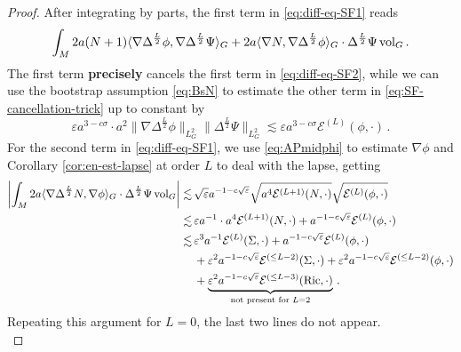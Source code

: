 \documentclass[11pt,leqno,textwidth=10cm]{amsart}
\numberwithin{equation}{section}
\theoremstyle{definition}
\theoremstyle{plain}
\newcommand{\1}{\mathbbm{1}}
\newcommand{\E}{\mathcal{E}}
\newcommand{\Ric}{\text{\normalfont{Ric}}}
\newcommand{\vol}[1]{{\text{\normalfont{vol}}}_{#1}}
\renewcommand{\epsilon}{\varepsilon}
\newcommand{\Lap}{\Delta}
\begin{document}
\begin{proof}
After integrating by parts, the first term in \eqref{eq:diff-eq-SF1} reads
\begin{equation}\label{eq:SF-cancellation-trick}
\int_M 2a(N+1)\langle\nabla\Lap^{\frac{L}2}\phi,\nabla\Lap^{\frac{L}2}\Psi\rangle_G+2a\langle\nabla N,\nabla\Lap^{\frac{L}2}\phi\rangle_G\cdot\Lap^{\frac{L}2}\Psi\,\vol{G}\,.
\end{equation}
The first term \textbf{precisely} cancels the first term in \eqref{eq:diff-eq-SF2}, while we can use the bootstrap assumption \eqref{eq:BsN} to estimate the other term in \eqref{eq:SF-cancellation-trick} up to constant by
\begin{equation*}
\epsilon a^{3-c\sigma}\cdot a^2\|\nabla\Lap^{\frac{L}2}\phi\|_{L^2_G}\|\Lap^{\frac{L}2}\Psi\|_{L^2_G}\lesssim\epsilon a^{3-c\sigma}\E^{(L)}(\phi,\cdot)\,.
\end{equation*}
For the second term in \eqref{eq:diff-eq-SF1}, we use \eqref{eq:APmidphi} to estimate $\nabla\phi$ and Corollary \ref{cor:en-est-lapse} at order $L$ to deal with the lapse, getting
\begin{align*}
\left\lvert\int_M 2a\langle\nabla\Lap^{\frac{L}2}N,\nabla\phi\rangle_G\cdot \Lap^{\frac{L}2}\Psi\,\vol{G}\right\rvert\lesssim&\,\sqrt{\epsilon}a^{-1-c\sqrt{\epsilon}}\sqrt{a^4\E^{(L+1)}(N,\cdot)}\sqrt{\E^{(L)}(\phi,\cdot)}\\
\lesssim&\,\epsilon a^{-1}\cdot a^4\E^{(L+1)}(N,\cdot)+a^{-1-c\sqrt{\epsilon}}\E^{(L)}(\phi,\cdot)\\
\lesssim&\,\epsilon^3a^{-1}\E^{(L)}(\Sigma,\cdot)+a^{-1-c\sqrt{\epsilon}}\E^{(L)}(\phi,\cdot)\\
&\,+\epsilon^2a^{-1-c\sqrt{\epsilon}}\E^{(\leq L-2)}(\Sigma,\cdot)+\epsilon^2a^{-1-c\sqrt{\epsilon}}\E^{(\leq L-2)}(\phi,\cdot)\\
&\,+\underbrace{\epsilon^2a^{-1-c\sqrt{\epsilon}}\E^{(\leq L-3)}(\Ric,\cdot)}_{\text{not present for }L=2}\,.
\end{align*}
Repeating this argument for $L=0$, the last two lines do not appear.\\


\end{proof}
\end{document}
